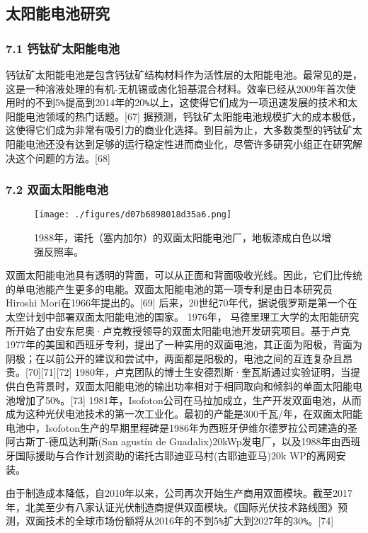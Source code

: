 \subsection{太阳能电池研究}

\subsubsection{7.1 钙钛矿太阳能电池}

钙钛矿太阳能电池是包含钙钛矿结构材料作为活性层的太阳能电池。最常见的是，这是一种溶液处理的有机-无机锡或卤化铅基混合材料。效率已经从2009年首次使用时的不到5\verb|%|提高到2014年的20\verb|%|以上，这使得它们成为一项迅速发展的技术和太阳能电池领域的热门话题。[67] 据预测，钙钛矿太阳能电池规模扩大的成本极低，这使得它们成为非常有吸引力的商业化选择。到目前为止，大多数类型的钙钛矿太阳能电池还没有达到足够的运行稳定性进而商业化，尽管许多研究小组正在研究解决这个问题的方法。[68]

\subsubsection{7.2 双面太阳能电池}

\begin{figure}[ht]
\centering
\texttt{[image: ./figures/d07b6898018d35a6.png]}
\caption{1988年，诺托（塞内加尔）的双面太阳能电池厂，地板漆成白色以增强反照率。} \label{fig_TYNDC_5}
\end{figure}

双面太阳能电池具有透明的背面，可以从正面和背面吸收光线。因此，它们比传统的单电池能产生更多的电能。双面太阳能电池的第一项专利是由日本研究员Hiroshi Mori在1966年提出的。[69] 后来，20世纪70年代，据说俄罗斯是第一个在太空计划中部署双面太阳能电池的国家。 1976年， 马德里理工大学的太阳能研究所开始了由安东尼奥·卢克教授领导的双面太阳能电池开发研究项目。基于卢克1977年的美国和西班牙专利，提出了一种实用的双面电池，其正面为阳极，背面为阴极；在以前公开的建议和尝试中，两面都是阳极的，电池之间的互连复杂且昂贵。[70][71][72] 1980年，卢克团队的博士生安德烈斯·奎瓦斯通过实验证明，当提供白色背景时，双面太阳能电池的输出功率相对于相同取向和倾斜的单面太阳能电池增加了50\verb|%|。[73] 1981年，Isofoton公司在马拉加成立，生产开发双面电池，从而成为这种光伏电池技术的第一次工业化。最初的产能是300千瓦/年，在双面太阳能电池中，Isofoton生产的早期里程碑是1986年为西班牙伊维尔德罗拉公司建造的圣阿古斯丁-德瓜达利斯(San agustín de Guadalix)20kWp发电厂，以及1988年由西班牙国际援助与合作计划资助的诺托古耶迪亚马村(古耶迪亚马)20k WP的离网安装。

由于制造成本降低，自2010年以来，公司再次开始生产商用双面模块。截至2017年，北美至少有八家认证光伏制造商提供双面模块。《国际光伏技术路线图》预测，双面技术的全球市场份额将从2016年的不到5\verb|%|扩大到2027年的30\verb|%|。[74]

